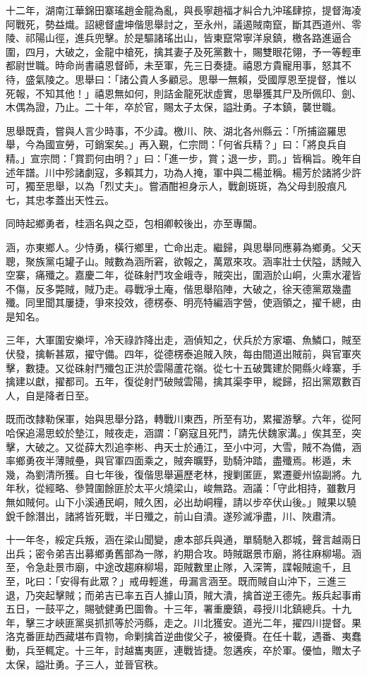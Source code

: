 \begin{pinyinscope}
十二年，湖南江華錦田寨瑤趙金龍為亂，與長寧趙福才糾合九沖瑤肆掠，提督海凌阿戰死，勢益熾。詔總督盧坤偕思舉討之，至永州，議遏賊南竄，斷其西道州、零陵、祁陽山徑，進兵兜擊。於是驅諸瑤出山，皆東竄常寧洋泉鎮，檄各路進逼合圍，四月，大破之，金龍中槍死，擒其妻子及死黨數十，賜雙眼花翎，予一等輕車都尉世職。時命尚書禧恩督師，未至軍，先三日奏捷。禧恩方貴寵用事，怒其不待，盛氣陵之。思舉曰：「諸公貴人多顧忌。思舉一無賴，受國厚恩至提督，惟以死報，不知其他！」禧恩無如何，則詰金龍死狀虛實，思舉獲其尸及所佩印、劍、木偶為證，乃止。二十年，卒於官，賜太子太保，謚壯勇。子本鎮，襲世職。

思舉既貴，嘗與人言少時事，不少諱。檄川、陜、湖北各州縣云：「所捕盜羅思舉，今為國宣勞，可銷案矣。」再入覲，仁宗問：「何省兵精？」曰：「將良兵自精。」宣宗問：「賞罰何由明？」曰：「進一步，賞；退一步，罰。」皆稱旨。晚年自述年譜。川中殄諸劇寇，多賴其力，功為人掩，軍中與二楊並稱。楊芳於諸將少許可，獨至思舉，以為「烈丈夫」。嘗酒酣袒身示人，戰創斑斑，為父母刲股痕凡七，其忠孝蓋出天性云。

同時起鄉勇者，桂涵名與之亞，包相卿較後出，亦至專閫。

涵，亦東鄉人。少恃勇，橫行鄉里，亡命出走。繼歸，與思舉同應募為鄉勇。父天聰，聚族黨屯罐子山。賊數為涵所窘，欲報之，萬眾來攻。涵率壯士伏隘，誘賊入空寨，痛殲之。嘉慶二年，從硃射鬥攻金峨寺，賊突出，圍涵於山峒，火熏水灌皆不傷，反多斃賊，賊乃走。尋戰凈土庵，偕思舉陷陣，大破之，徐天德黨眾幾盡殲。同里聞其屢捷，爭來投效，德楞泰、明亮特編涵字營，使涵領之，擢千總，由是知名。

三年，大軍圍安樂坪，冷天祿詐降出走，涵偵知之，伏兵於方家壩、魚鱗口，賊至伏發，擒斬甚眾，擢守備。四年，從德楞泰追賊入陜，每由間道出賊前，與官軍夾擊，數捷。又從硃射鬥殲包正洪於雲陽蘆花嶺。從七十五破龔建於開縣火峰寨，手擒建以獻，擢都司。五年，復從射鬥破賊雲陽，擒其渠李甲，縱歸，招出黨眾數百人，自是降者日至。

既而改隸勒保軍，始與思舉分路，轉戰川東西，所至有功，累擢游擊。六年，從阿哈保追湯思蛟於墊江，賊夜走，涵謂：「窮寇且死鬥，請先伏魏家溝。」俟其至，突擊，大破之。又從薛大烈追李彬、冉天士於通江，至小中河，大雪，賊不為備，涵率鄉勇夜半薄賊壘，與官軍四面乘之，賊奔曠野，勁騎沖踏，盡殲焉。彬遁，未幾，為劉清所獲。自七年後，復偕思舉遍歷老林，搜剿匿匪，累遷夔州協副將。九年秋，從經略、參贊圍餘匪於太平火燒梁山，峻無路。涵議：「守此相持，雖數月無如賊何。山下小溪通民峒，賊久困，必出劫峒糧，請以步卒伏山後。」賊果以驍銳千餘潛出，諸將皆死戰，半日殲之，前山自潰。遂殄滅凈盡，川、陜肅清。

十一年冬，綏定兵叛，涵在梁山聞變，慮本部兵與通，單騎馳入郡城，聲言越兩日出兵；密令弟吉出募鄉勇舊部為一隊，約期合攻。時賊踞景市廟，將往麻柳場。涵至，令急赴景市廟，中途改趨麻柳場，距賊數里止隊，入深箐，諜報賊逾千，且至，叱曰：「安得有此眾？」戒毋輕進，毋漏言涵至。既而賊自山沖下，三進三退，乃突起擊賊；而弟吉已率五百人據山頂，賊大潰，擒首逆王德先。叛兵起事甫五日，一鼓平之，賜號健勇巴圖魯。十三年，署重慶鎮，尋授川北鎮總兵。十九年，擊三才峽匪黨吳抓抓等於沔縣，走之。川北獲安。道光二年，擢四川提督。果洛克番匪劫西藏堪布貢物，命剿擒首逆曲俊父子，被優賚。在任十載，遇番、夷蠢動，兵至輒定。十三年，討越巂夷匪，連戰皆捷。忽遘疾，卒於軍。優恤，贈太子太保，謚壯勇。子三人，並晉官秩。


\end{pinyinscope}
